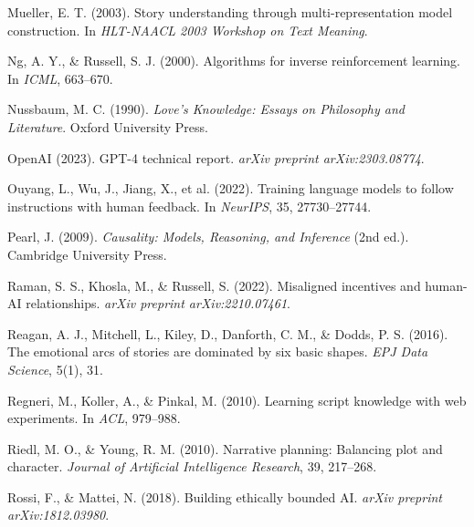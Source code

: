 \documentclass[12pt]{article}
\begin{document}
\begin{thebibliography}{99}
Mueller, E. T. (2003).
\newblock Story understanding through multi-representation model construction.
\newblock In \textit{HLT-NAACL 2003 Workshop on Text Meaning}.

Ng, A. Y., \& Russell, S. J. (2000).
\newblock Algorithms for inverse reinforcement learning.
\newblock In \textit{ICML}, 663--670.

Nussbaum, M. C. (1990).
\newblock \textit{Love's Knowledge: Essays on Philosophy and Literature}.
\newblock Oxford University Press.

OpenAI (2023).
\newblock GPT-4 technical report.
\newblock \textit{arXiv preprint arXiv:2303.08774}.

Ouyang, L., Wu, J., Jiang, X., et al. (2022).
\newblock Training language models to follow instructions with human feedback.
\newblock In \textit{NeurIPS}, 35, 27730--27744.

Pearl, J. (2009).
\newblock \textit{Causality: Models, Reasoning, and Inference} (2nd ed.).
\newblock Cambridge University Press.

Raman, S. S., Khosla, M., \& Russell, S. (2022).
\newblock Misaligned incentives and human-AI relationships.
\newblock \textit{arXiv preprint arXiv:2210.07461}.

Reagan, A. J., Mitchell, L., Kiley, D., Danforth, C. M., \& Dodds, P. S. (2016).
\newblock The emotional arcs of stories are dominated by six basic shapes.
\newblock \textit{EPJ Data Science}, 5(1), 31.

Regneri, M., Koller, A., \& Pinkal, M. (2010).
\newblock Learning script knowledge with web experiments.
\newblock In \textit{ACL}, 979--988.

Riedl, M. O., \& Young, R. M. (2010).
\newblock Narrative planning: Balancing plot and character.
\newblock \textit{Journal of Artificial Intelligence Research}, 39, 217--268.

Rossi, F., \& Mattei, N. (2018).
\newblock Building ethically bounded AI.
\newblock \textit{arXiv preprint arXiv:1812.03980}.


\end{thebibliography}
\end{document}
